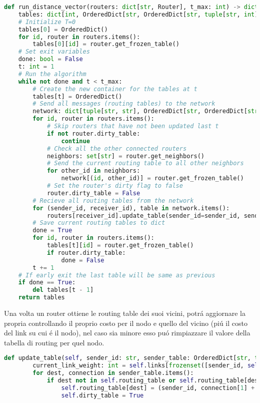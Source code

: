 \documentclass[12pt]{article}
\begin{document}
\begin{lstlisting}[language=Python, caption=Simulazione della rete]
def run_distance_vector(routers: dict[str, Router], t_max: int) -> dict[int, OrderedDict[str, OrderedDict[str, tuple[str, int]]]]:
    tables: dict[int, OrderedDict[str, OrderedDict[str, tuple[str, int]]]] = dict()
    # Initialize T=0
    tables[0] = OrderedDict()
    for id, router in routers.items():
        tables[0][id] = router.get_frozen_table()
    # Set exit variables
    done: bool = False
    t: int = 1
    # Run the algorithm
    while not done and t < t_max:
        # Create the new container for the tables at t
        tables[t] = OrderedDict()
        # Send all messages (routing tables) to the network
        network: dict[tuple[str, str], OrderedDict[str, OrderedDict[str, tuple[str, int]]]] = dict()
        for id, router in routers.items():
            # Skip routers that have not been updated last t
            if not router.dirty_table:
                continue
            # Check all the other connected routers
            neighbors: set[str] = router.get_neighbors()
            # Send the current routing table to all other neighbors
            for other_id in neighbors:
                network[(id, other_id)] = router.get_frozen_table()
            # Set the router's dirty flag to false
            router.dirty_table = False
        # Recieve all routing tables from the network
        for (sender_id, receiver_id), table in network.items():
            routers[receiver_id].update_table(sender_id=sender_id, sender_table=table)
        # Save current routing tables to dict
        done = True
        for id, router in routers.items():
            tables[t][id] = router.get_frozen_table()
            if router.dirty_table:
                done = False
        t += 1
    # If early exit the last table will be same as previous
    if done == True:
        del tables[t - 1]
    return tables
\end{lstlisting}
Una volta un router ottiene le routing table dei suoi vicini, potrá aggiornare la propria controllando il proprio costo per il nodo e quello del vicino (piú il costo del link su cui é il nodo), nel caso sia minore esso puó rimpiazzare il valore della tabella di routing per quel nodo.
\begin{lstlisting}[language=Python, caption=Funzione di aggiornamento delle tabelle]
    def update_table(self, sender_id: str, sender_table: OrderedDict[str, tuple[str, int]]) -> None:
        current_link_weight: int = self.links[frozenset([sender_id, self.id])]
        for dest, connection in sender_table.items():
            if dest not in self.routing_table or self.routing_table[dest][1] > connection[1] + current_link_weight:
                self.routing_table[dest] = (sender_id, connection[1] + current_link_weight)
                self.dirty_table = True
\end{lstlisting}
\end{document}
